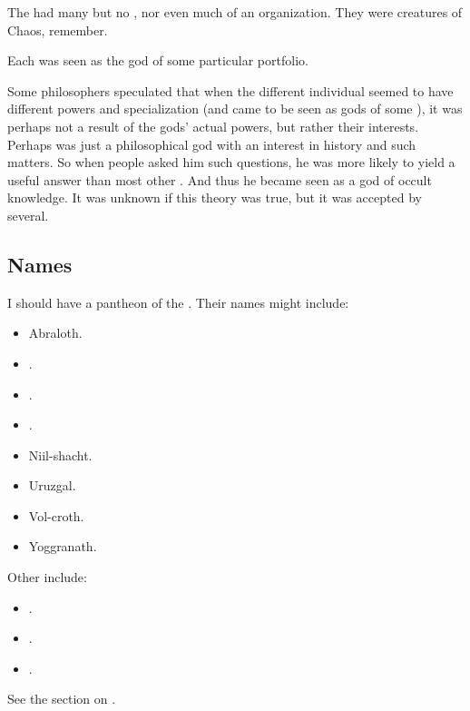The \xss{} had many  but no , nor even much of an organization. 
They were creatures of Chaos, remember. 

Each \xs was seen as the god of some particular portfolio. 

Some \draconian philosophers speculated that when the different individual \xss seemed to have different powers and specialization (and came to be seen as gods of some ), it was perhaps not a result of the gods' actual powers, but rather their interests.
Perhaps \NerranKoss was just a philosophical god with an interest in history and such matters. 
So when people asked him such questions, he was more likely to yield a useful answer than most other \xss.
And thus he became seen as a god of occult knowledge. 
It was unknown if this theory was true, but it was accepted by several. 








\subsection{Names}
I should have a pantheon of the . Their names might include: 

\begin{itemize}
  \item Abraloth. 
  \item {}. 
  \item {}. 
  \item {}. 
  \item Niil-shacht.
  \item Uruzgal. 
  \item Vol-croth. 
  \item Yoggranath. 
\end{itemize}

Other \xss{} include:

\begin{itemize}
  \item {}. 
  \item {}.
  \item {}. 
\end{itemize}

See the section on . 










